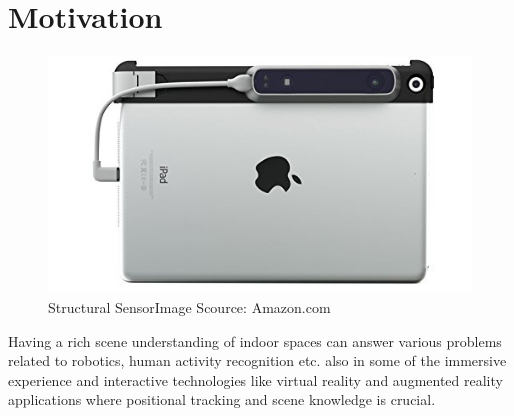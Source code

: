 \section{Motivation}
\begin{figure}[!b]
    \centering
    \includegraphics[width = 12cm]{Figures/ipad.jpg}
    \caption{Structural SensorImage Scource: Amazon.com}
    \label{fig:Structural_Sensor}
\end{figure}{}

Having a rich scene understanding of indoor spaces can answer various problems related to robotics, human activity recognition etc. also in some of the immersive experience and interactive technologies like  virtual reality and augmented reality applications where positional tracking and scene knowledge is crucial.

